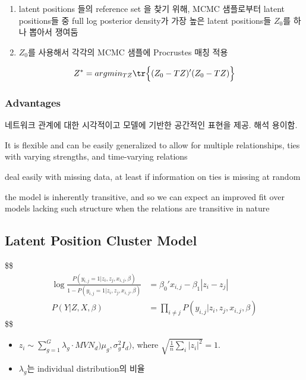 \documentclass[
]{book}
\providecommand{\tightlist}{%
  \setlength{\itemsep}{0pt}\setlength{\parskip}{0pt}}
\begin{document}
{{{\begin{enumerate}
  \begin{enumerate}
  \def\labelenumii{\alph{enumii}.}
  \tightlist
  \item
    latent positions 들의 reference set 을 찾기 위해, MCMC 샘플로부터 latent positions들 중 full log posterior density가 가장 높은 latent positions들 \(Z_0\)를 하나 뽑아서 쟁여둠
  \item
    \(Z_0\)를 사용해서 각각의 MCMC 샘플에 Procrustes 매칭 적용
  \end{enumerate}
\end{enumerate}

\[
Z^\ast  = argmin_{TZ} \tr \Big \{ (Z_0 - TZ) ' (Z_0 - TZ) \Big \}
\]

\hypertarget{advantages}{%
\subsubsection{Advantages}\label{advantages}}

네트워크 관계에 대한 시각적이고 모델에 기반한 공간적인 표현을 제공. 해석 용이함.

It is flexible and can be easily generalized to allow for multiple
relationships, ties with varying strengths, and time-varying relations

deal easily with missing data, at least if information on ties is missing at
random

the model is inherently transitive, and so we can expect an improved fit
over models lacking such structure when the relations are transitive in
nature

\hypertarget{latent-position-cluster-model}{%
\subsection{Latent Position Cluster Model}\label{latent-position-cluster-model}}

\$\$
\begin{align}


\log \frac{P(y_{i, j} = 1\Big | z_i , z_j , x_{i,j}, \beta)}{1 - P(y_{i, j} = 1 \Big | z_i , z_j , x_{i,j}, \beta)} &= \beta_0 ' x_{i,j} - \beta_1 |z_i - z_j |

\\

P(Y | Z, X, \beta) &= \prod_{i \not = j} P(y_{i, j} \Big | z_i , z_j , x_{i,j}, \beta) \tag{Likelihood}


\end{align}
\$\$

\begin{itemize}
\tightlist
\item
  \(z_i \sim \sum\limits_{g=1}^G \lambda_g \cdot MVN_d )\mu_g , \sigma^2_g I_d )\), where \(\sqrt{\frac{1}{n} \sum_i |z_i|^2} = 1\).
\item
  \(\lambda_g\)는 individual distribution의 비율
\end{itemize}

}}}
\end{document}
